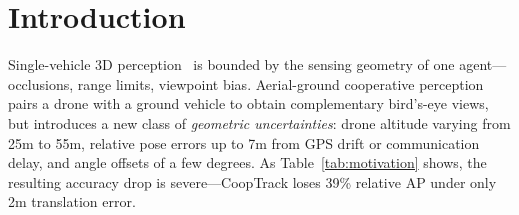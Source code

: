 \documentclass[9.5pt,twocolumn,a4paper]{IEEEtran}
\begin{document}
\section{Introduction}
\label{sec:intro}

Single-vehicle 3D perception~\cite{bevformer,petr} is bounded by the sensing geometry of one agent---occlusions, range limits, viewpoint bias. Aerial-ground cooperative perception pairs a drone with a ground vehicle to obtain complementary bird's-eye views, but introduces a new class of \emph{geometric uncertainties}: drone altitude varying from 25m to 55m, relative pose errors up to 7m from GPS drift or communication delay, and angle offsets of a few degrees. As Table~\ref{tab:motivation} shows, the resulting accuracy drop is severe---CoopTrack loses 39\% relative AP under only 2m translation error.
\end{document}
